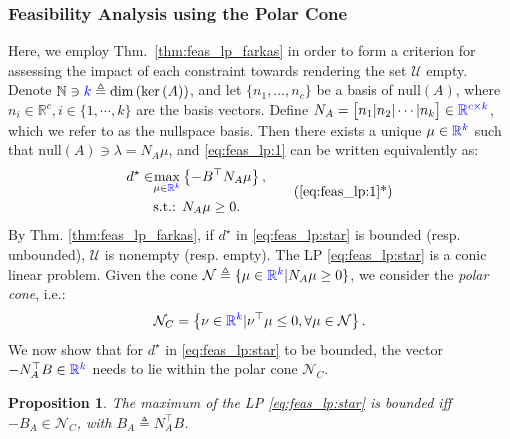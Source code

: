 \documentclass[letterpaper, 10 pt, conference]{ieeeconf}  %
\newtheorem{proposition}{\textbf{Proposition}}
\begin{document}
\subsubsection{\textbf{Feasibility Analysis using the Polar Cone}}
Here, we employ Thm.~\ref{thm:feas_lp_farkas} in order to form a criterion for assessing the impact of each constraint towards rendering the set $\mathcal{U}$ empty.
Denote $\mathbb{N} \ni {\color{blue}k} \triangleq \textrm{dim}\left( \textrm{ker} \left( A\right) \right)$, and let $\{n_1,\dots,n_c\}$ be a basis of $\textrm{null}(A)$, where $n_i \in \mathbb{R}^c, i \in \{1,\cdots,k\}$ are the basis vectors. Define $N_A = \bigl[ n_1 | n_2 | \cdots | n_k\bigr] \in {\color{blue}\mathbb{R}^{c\times k}}$, {\color{red}which we refer to as the nullspace basis}. Then there exists a unique $\mu \in {\color{blue}\mathbb{R}^k}$ such that $\textrm{null}(A)\ni\lambda = N_A \mu$, and 
\eqref{eq:feas_lp:1} can be written equivalently as:
\begin{equation}\label{eq:feas_lp:star}
    \begin{split}
        d^\star \in &\underset{\mu\in{\color{blue}\mathbb{R}^k}}{\max}
        \left\{
            -B^\top N_A \mu 
        \right\},        \\
        &\textrm{s.t.: } N_A \mu\geq 0.
    \end{split}
    \tag{\ref{eq:feas_lp:1}*}
\end{equation}
By Thm. \ref{thm:feas_lp_farkas}, if {\color{blue}$d^\star$ in} \eqref{eq:feas_lp:star} is bounded (resp. unbounded), $\mathcal{U}$ is nonempty (resp. empty). The LP \eqref{eq:feas_lp:star} is a conic linear problem. Given the cone $\mathcal{N} \triangleq \{ \mu \in {\color{blue}\mathbb{R}^k} | N_A \mu \geq 0\}$, we consider the \textit{polar cone}, i.e.:
\begin{equation}\label{eq:polar_cone}
    \mathcal{N}_C = 
    \left\{ 
        \nu \in {\color{blue}\mathbb{R}^k} | \nu^\top\mu \leq 0, \forall \mu \in \mathcal{N}
    \right\}.
\end{equation}
We now show that for {\color{blue}$d^\star$ in} \eqref{eq:feas_lp:star} to be bounded, the vector $- N_A^\top B \in {\color{blue}\mathbb{R}^k}$ needs to lie within the polar cone $\mathcal{N}_C$. 
\begin{proposition}\label{prop:cone}
    The {\color{blue}maximum of the} LP \eqref{eq:feas_lp:star} is bounded iff $-B_A\in \mathcal{N}_C$, with $B_A \triangleq  N_A^\top  B$. 
\end{proposition}
\end{document}
